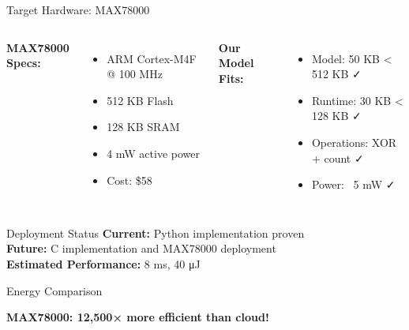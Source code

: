 \documentclass[aspectratio=169]{beamer}
\begin{document}
\begin{frame}{Target Hardware: MAX78000}
\begin{columns}
\textbf{MAX78000 Specs:}
\begin{itemize}
    \item ARM Cortex-M4F @ 100 MHz
    \item 512 KB Flash
    \item 128 KB SRAM
    \item 4 mW active power
    \item Cost: \$58
\end{itemize}

\textbf{Our Model Fits:}
\begin{itemize}
    \item Model: 50 KB < 512 KB ✓
    \item Runtime: 30 KB < 128 KB ✓
    \item Operations: XOR + count ✓
    \item Power: ~5 mW ✓
\end{itemize}
\end{columns}

\vspace{1em}

\begin{block}{Deployment Status}
\textbf{Current:} Python implementation proven\\
\textbf{Future:} C implementation and MAX78000 deployment\\
\textbf{Estimated Performance:} 8 ms, 40 μJ
\end{block}
\end{frame}

\begin{frame}{Energy Comparison}
\begin{center}
\end{center}

\textbf{MAX78000: 12,500× more efficient than cloud!}
\end{frame}
\end{document}
